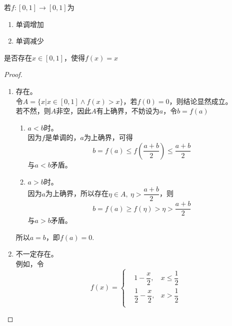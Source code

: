 \begin{proposition}

    若$f:[0,1] \to [0,1]$为

    \begin{enumerate}

            \item 单调增加
            
            \item 单调减少

    \end{enumerate}

    是否存在$x \in [0,1]$，使得$f(x) = x$

\end{proposition}

\begin{proof}

    \begin{enumerate}

        \item 
            存在。\\
            令$A = \{x | x \in [0,1] \land f(x) > x \} $，若$f(0) = 0$，则结论显然成立。\\
            若不然，则$A$非空，因此$A$有上确界，不妨设为$a$，令$b = f(a)$

            \begin{enumerate}

                \item $a<b$时。\\
                    因为$f$是单调的，$a$为上确界，可得
                    $$b = f(a) \leq f\left( \dfrac{a + b}{2} \right) \leq \dfrac{a + b}{2}$$
                    与$a<b$矛盾。

                \item 
                    $a>b$时。\\
                    因为$a$为上确界，所以存在$\eta \in A, \ \eta > \dfrac{a + b}{2}$，则
                    $$b = f(a) \geq f(\eta) > \eta > \dfrac{a + b}{2}$$
                    与$a>b$矛盾。

            \end{enumerate}

            所以$a = b$，即$f(a) = 0$.
        
        \item 
            不一定存在。\\
            例如，令
            $$f(x) = \left\{
                \begin{aligned}
                    & 1 - \dfrac{x}{2}, &x \leq \dfrac{1}{2} \\
                    & \dfrac{1}{2} - \dfrac{x}{2} , &x > \dfrac{1}{2} \\
                \end{aligned}
                \right.
            $$
            
    \end{enumerate}

\end{proof}

